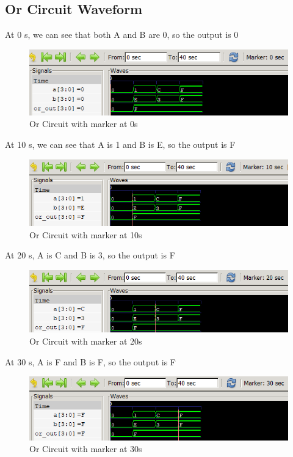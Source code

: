 \documentclass[12pt]{article}
\begin{document}
\newpage



\subsection{Or Circuit Waveform}

At 0 s, we can see that both A and B are 0, so the output is 0
\begin{figure}[h]
    \centering
    \includegraphics[width = 1.0\textwidth]{figs/Or0.png}
    \caption{Or Circuit with marker at 0s}
    \label{fig:enter-label}
\end{figure}


At 10 s, we can see that A is 1 and B is E, so the output is F
\begin{figure}[h]
    \centering
    \includegraphics[width = 1.0\textwidth]{figs/Or10.png}
    \caption{Or Circuit with marker at 10s}
    \label{fig:enter-label}
\end{figure}

At 20 s, A is C and B is 3, so the output is F
\begin{figure}[h]
    \centering
    \includegraphics[width = 1.0\textwidth]{figs/Or20.png}
    \caption{Or Circuit with marker at 20s}
    \label{fig:enter-label}
\end{figure}

\newpage

At 30 s, A is F and B is F, so the output is F
\begin{figure}[h]
    \centering
    \includegraphics[width = 1.0\textwidth]{figs/Or30.png}
    \caption{Or Circuit with marker at 30s}
    \label{fig:enter-label}
\end{figure}
\end{document}
